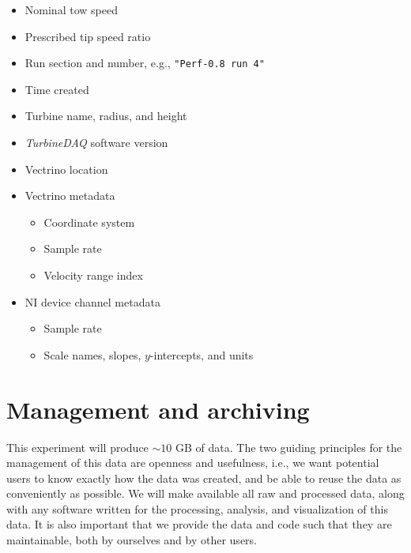 \documentclass[12pt,letterpaper]{scrreprt}
\begin{document}
\begin{itemize}

	\item Nominal tow speed
	
	\item Prescribed tip speed ratio
	
	\item Run section and number, e.g., \texttt{"Perf-0.8 run 4"}
	
	\item Time created
	
	\item Turbine name, radius, and height
	
	\item \textit{TurbineDAQ} software version
	
	\item Vectrino location
	
	\item Vectrino metadata
	
		\begin{itemize}
		
			\item Coordinate system
			
			\item Sample rate
			
			\item Velocity range index
		
		\end{itemize}
		
	\item NI device channel metadata
	
		\begin{itemize}
		
		\item Sample rate
		
		\item Scale names, slopes, $y$-intercepts, and units 
		
		\end{itemize}

\end{itemize}


\section{Management and archiving}

This experiment will produce $\sim 10$ GB of data. The two guiding principles
for the management of this data are openness and usefulness, i.e., we want
potential users to know exactly how the data was created, and be able to reuse
the data as conveniently as possible. We will make available all raw and
processed data, along with any software written for the processing, analysis,
and visualization of this data. It is also important that we provide the data
and code such that they are maintainable, both by ourselves and by other users.
\end{document}
